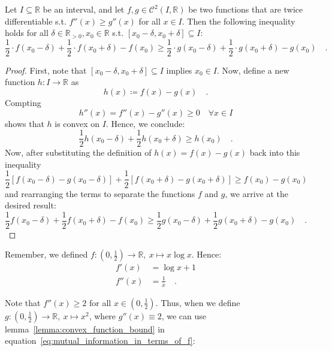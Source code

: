\documentclass[../../main.tex]{subfiles}
\begin{document}
\begin{lemma}
    \label{lemma:convex_function_bound}
    Let $I \subseteq \mathbb{R}$ be an interval, and let $f, g \in \mathcal{C}^2(I, \mathbb{R})$ be two functions that are twice differentiable s.t. $f''(x) \geq g''(x)$ for all $x \in I$. Then the following inequality holds for all $\delta \in \mathbb{R}_{>0}, x_0 \in \mathbb{R}$ s.t. $[x_0 - \delta, x_0 + \delta] \subseteq I$:
    \[
        \frac{1}{2} \cdot f(x_0 - \delta) + \frac{1}{2} \cdot f(x_0 + \delta) - f(x_0) \geq \frac{1}{2} \cdot g(x_0 - \delta) + \frac{1}{2} \cdot g(x_0 + \delta) - g(x_0) \quad .
    \]
\end{lemma}
\begin{proof}
    First, note that $[x_0 - \delta, x_0 + \delta] \subseteq I$ implies $x_0 \in I$. Now, define a new function $h: I \to \mathbb{R}$ as
    \[
        h(x) \coloneqq f(x) - g(x) \quad .
    \]
    Compting
    \[
        h''(x) = f''(x) - g''(x) \geq 0 \quad \forall x \in I
    \]
    shows that $h$ is convex on $I$. Hence, we conclude:
    \[
        \frac{1}{2} h(x_0 - \delta) + \frac{1}{2} h(x_0 + \delta) \geq h(x_0) \quad .
    \]
    Now, after substituting the definition of $h(x) = f(x) - g(x)$ back into this inequality
    \[
        \frac{1}{2} [f(x_0 - \delta) - g(x_0 - \delta)] + \frac{1}{2} [f(x_0 + \delta) - g(x_0 + \delta)] \geq f(x_0) - g(x_0)
    \]
    and rearranging the terms to separate the functions $f$ and $g$, we arrive at the desired result:
    \[
        \frac{1}{2} f(x_0 - \delta) + \frac{1}{2} f(x_0 + \delta) - f(x_0) \geq \frac{1}{2} g(x_0 - \delta) + \frac{1}{2} g(x_0 + \delta) - g(x_0) \quad .
    \]
\end{proof}

Remember, we defined $f: (0, \frac{1}{2}) \to \mathbb{R}, \ x \mapsto x \log x$. Hence:
\begin{align*}
    f'(x) &= \log x + 1 \\
    f''(x) &= \frac{1}{x} \quad .
\end{align*}

Note that $f''(x) \geq 2$ for all $x \in (0, \frac{1}{2})$. Thus, when we define $g: (0, \frac{1}{2}) \to \mathbb{R}, \ x \mapsto x^2$, where $g''(x) \equiv 2$, we can use lemma~\ref{lemma:convex_function_bound} in equation~\eqref{eq:mutual_information_in_terms_of_f}:
\end{document}
